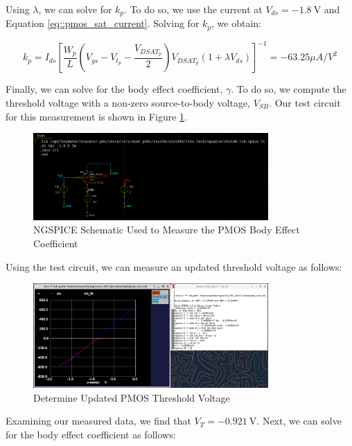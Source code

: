 \documentclass{article}
\begin{document}
	\noindent Using $\lambda$, we can solve for $k_p$. To do so, we use the current at $V_{ds}=-1.8\ \text{V}$ and Equation \ref{eq::pmos_sat_current}. Solving for $k_p$, we obtain:
	
	\begin{equation}
		k_p = I_{ds}\left[\frac{W_p}{L}\left(V_{gs} - V_{t_p} - \frac{V_{DSAT_p}}{2}\right)V_{DSAT_p}(1 + {\lambda}V_{ds})\right]^{-1} = -63.25 {\mu}A/V^2
	\end{equation}
	
	Finally, we can solve for the body effect coefficient, $\gamma$. To do so, we compute the threshold voltage with a non-zero source-to-body voltage, $V_{SB}$. Our test circuit for this measurement is shown in Figure \ref{fig::pmos_gamma_meas_schem}.
	
	 \begin{figure}[H]
		\centerline{\includegraphics[width=0.8\textwidth]{pmos_gamma_meas_schem.png}}
		\caption{NGSPICE Schematic Used to Measure the PMOS Body Effect Coefficient}
		\label{fig::pmos_gamma_meas_schem}
	\end{figure}
	
	\noindent Using the test circuit, we can measure an updated threshold voltage as follows:
	
	\begin{figure}[H]
		\centerline{\includegraphics[width=0.8\textwidth]{pmos_gamma_meas.png}}
		\caption{Determine Updated PMOS Threshold Voltage}
		\label{fig::pmos_gamma_meas}
	\end{figure}
	
	\noindent Examining our measured data, we find that $V_T = -0.921\ \text{V}$. Next, we can solve for the body effect coefficient as follows:
	
\end{document}
